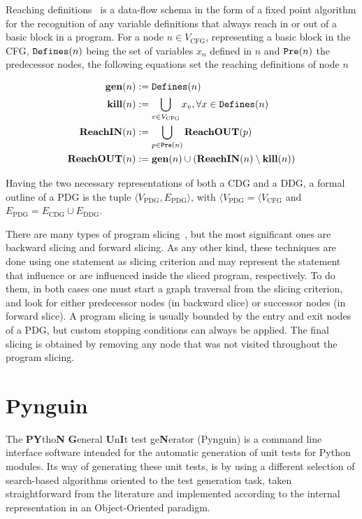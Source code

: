 \documentclass[%
  chapterprefix=false,%
  open=right,%
  twoside=true,%
  paper=a4,%
  logofile={Figures/logo.png},%
  thesistype=master,%
  UKenglish,%
]{se2thesis}
\newcommand{\callable}[2][]{\(\text{\texttt{#2}}(#1)\)}
\begin{document}
Reaching definitions~\cite{DBLP:books/aw/AhoSU86} is a data-flow schema in the form of a fixed point algorithm for the recognition of any variable definitions that always reach in or out of a basic block in a program.
For a node \(n \in V_{\text{CFG}}\), representing a basic block in the CFG, \callable[n]{Defines} being the set of variables \(x_n\) defined in \(n\) and \callable[n]{Pre} the predecessor nodes, the following equations set the reaching definitions of node \(n\)

\begin{align*}
  \text{\textbf{gen}}(n) &:= \text{\callable[n]{Defines}} \\
  \text{\textbf{kill}}(n) &:= \bigcup_{v \in V_{\text{CFG}}} x_v, \forall x \in \text{\callable[n]{Defines}} \\
  \text{\textbf{ReachIN}}(n) &:= \bigcup_{p \in \text{\callable[n]{Pre}}} \text{\textbf{ReachOUT}}(p) \\
  \text{\textbf{ReachOUT}}(n) &:= \text{\textbf{gen}}(n) \cup (\text{\textbf{ReachIN}}(n) \setminus \text{\textbf{kill}}(n))\\
\end{align*}

Having the two necessary representations of both a CDG and a DDG, a formal outline of a PDG is the tuple \(\langle V_{\text{PDG}}, E_{\text{PDG}} \rangle\), with \(\langle V_{\text{PDG}} = \langle V_{\text{CFG}}\) and \(E_{\text{PDG}} = E_{\text{CDG}} \cup E_{\text{DDG}}\).

There are many types of program slicing~\cite{DBLP:journals/csur/Silva12}, but the most significant ones are backward slicing and forward slicing.
As any other kind, these techniques are done using one statement as slicing criterion and may represent the statement that influence or are influenced inside the sliced program, respectively.
To do them, in both cases one must start a graph traversal from the slicing criterion, and look for either predecessor nodes (in backward slice) or successor nodes (in forward slice).
A program slicing is usually bounded by the entry and exit nodes of a PDG, but custom stopping conditions can always be applied.
The final slicing is obtained by removing any node that was not visited throughout the program slicing.


\newpage
\section{Pynguin}

The \textbf{PY}tho\textbf{N} \textbf{G}eneral \textbf{U}n\textbf{I}t test ge\textbf{N}erator (Pynguin) is a command line interface software intended for the automatic generation of unit tests for Python modules.
Its way of generating these unit tests, is by using a different selection of search-based algorithms oriented to the test generation task, taken straightforward from the literature and implemented according to the internal representation in an Object-Oriented paradigm.
\end{document}
